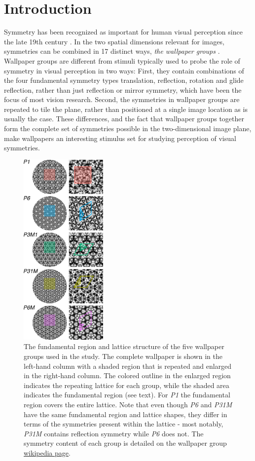 \documentclass[11pt, twoside]{article}
\begin{document}
\section*{Introduction}
Symmetry has been recognized as important for human visual perception since the late 19th century \citep{mach_1959}. In the two spatial dimensions relevant for images, symmetries can be combined in 17 distinct ways, \textit{the wallpaper groups} \citep{RN1562,RN1563,RN1425}. Wallpaper groups are different from stimuli typically used to probe the role of symmetry in visual perception in two ways: First, they contain combinations of the four fundamental symmetry types translation, reflection, rotation and glide reflection, rather than just reflection or mirror symmetry, which have been the focus of most vision research. Second, the symmetries in wallpaper groups are repeated to tile the plane, rather than positioned at a single image location as is usually the case. These differences, and the fact that wallpaper groups together form the complete set of symmetries possible in the two-dimensional image plane, make wallpapers an interesting stimulus set for studying perception of visual symmetries.
\begin{figure}[H]
	\centering
	\includegraphics[width=0.38\textwidth]{./figures/wpg_structure.pdf}
	\caption{The fundamental region and lattice structure of the five wallpaper groups used in the study. The complete wallpaper is shown in the left-hand column with a shaded region that is repeated and enlarged in the right-hand column. The colored outline in the enlarged region indicates the repeating lattice for each group, while the shaded area indicates the fundamental region (see text). For \textit{P1} the fundamental region covers the entire lattice. Note that even though \textit{P6} and \textit{P31M} have the same fundamental region and lattice shapes, they differ in terms of the symmetries present within the lattice - most notably, \textit{P31M} contains reflection symmetry while \textit{P6} does not. The symmetry content of each group is detailed on the wallpaper group \href{https://en.wikipedia.org/wiki/Wallpaper_group}{wikipedia page}.}
	\label{fig:wpg_structure}
\end{figure}
\end{document}
